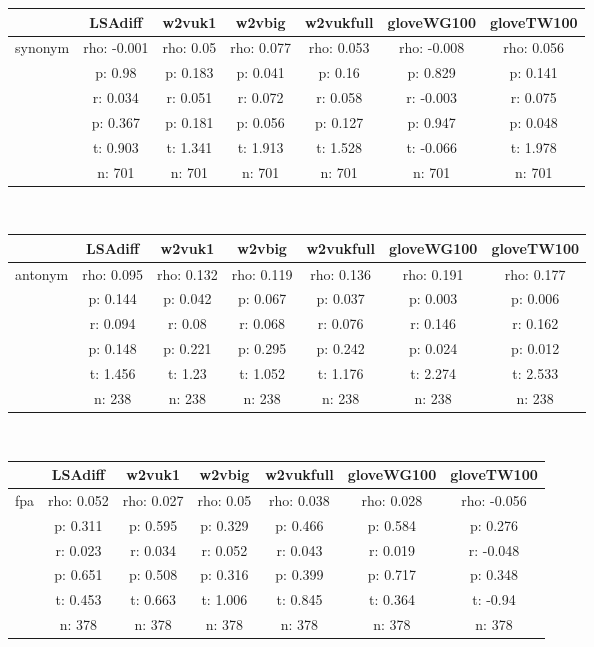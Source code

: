 \documentclass{article}
\begin{document}
\begin{tabular}{ccccccc|}\cline{2-7}
&\multicolumn{1}{|c}{LSAdiff} & w2vuk1 & w2vbig & w2vukfull & gloveWG100 & gloveTW100 \\\hline
\multicolumn{1}{|c|}{\multirow{6}{*}{synonym}} & rho: -0.001 & rho: 0.05 & rho: 0.077 & rho: 0.053 & rho: -0.008 & rho: 0.056 \\
\multicolumn{1}{|c|}{} & p: 0.98 & p: 0.183 & p: 0.041 & p: 0.16 & p: 0.829 & p: 0.141 \\
\multicolumn{1}{|c|}{} & r: 0.034 & r: 0.051 & r: 0.072 & r: 0.058 & r: -0.003 & r: 0.075 \\
\multicolumn{1}{|c|}{} & p: 0.367 & p: 0.181 & p: 0.056 & p: 0.127 & p: 0.947 & p: 0.048 \\
\multicolumn{1}{|c|}{} & t: 0.903 & t: 1.341 & t: 1.913 & t: 1.528 & t: -0.066 & t: 1.978 \\
\multicolumn{1}{|c|}{} & n: 701 & n: 701 & n: 701 & n: 701 & n: 701 & n: 701 \\
\hline
\end{tabular}\\
\begin{tabular}{ccccccc|}\cline{2-7}
&\multicolumn{1}{|c}{LSAdiff} & w2vuk1 & w2vbig & w2vukfull & gloveWG100 & gloveTW100 \\\hline
\multicolumn{1}{|c|}{\multirow{6}{*}{antonym}} & rho: 0.095 & rho: 0.132 & rho: 0.119 & rho: 0.136 & rho: 0.191 & rho: 0.177 \\
\multicolumn{1}{|c|}{} & p: 0.144 & p: 0.042 & p: 0.067 & p: 0.037 & p: 0.003 & p: 0.006 \\
\multicolumn{1}{|c|}{} & r: 0.094 & r: 0.08 & r: 0.068 & r: 0.076 & r: 0.146 & r: 0.162 \\
\multicolumn{1}{|c|}{} & p: 0.148 & p: 0.221 & p: 0.295 & p: 0.242 & p: 0.024 & p: 0.012 \\
\multicolumn{1}{|c|}{} & t: 1.456 & t: 1.23 & t: 1.052 & t: 1.176 & t: 2.274 & t: 2.533 \\
\multicolumn{1}{|c|}{} & n: 238 & n: 238 & n: 238 & n: 238 & n: 238 & n: 238 \\
\hline
\end{tabular}\\
\begin{tabular}{ccccccc|}\cline{2-7}
&\multicolumn{1}{|c}{LSAdiff} & w2vuk1 & w2vbig & w2vukfull & gloveWG100 & gloveTW100 \\\hline
\multicolumn{1}{|c|}{\multirow{6}{*}{fpa}} & rho: 0.052 & rho: 0.027 & rho: 0.05 & rho: 0.038 & rho: 0.028 & rho: -0.056 \\
\multicolumn{1}{|c|}{} & p: 0.311 & p: 0.595 & p: 0.329 & p: 0.466 & p: 0.584 & p: 0.276 \\
\multicolumn{1}{|c|}{} & r: 0.023 & r: 0.034 & r: 0.052 & r: 0.043 & r: 0.019 & r: -0.048 \\
\multicolumn{1}{|c|}{} & p: 0.651 & p: 0.508 & p: 0.316 & p: 0.399 & p: 0.717 & p: 0.348 \\
\multicolumn{1}{|c|}{} & t: 0.453 & t: 0.663 & t: 1.006 & t: 0.845 & t: 0.364 & t: -0.94 \\
\multicolumn{1}{|c|}{} & n: 378 & n: 378 & n: 378 & n: 378 & n: 378 & n: 378 \\
\hline
\end{tabular}\\
\end{document}
